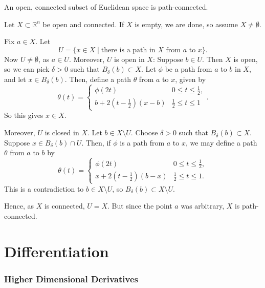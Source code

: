 \documentclass[12pt]{article}
\begin{document}
\begin{proposition}
	An open, connected subset of Euclidean space is path-connected.
\end{proposition}

\begin{proofbox}
	Let $X \subset \mathbb{R}^{n}$ be open and connected. If $X$ is empty, we are done, so assume $X \neq \emptyset$.

	Fix $a \in X$. Let
	\[
		U = \{x \in X \mid \text{there is a path in } X \text{ from } a \text{ to } x\}
	.\]
	Now $U \neq \emptyset$, as $a \in U$. Moreover, $U$ is open in $X$: Suppose $b \in U$. Then $X$ is open, so we can pick $\delta > 0$ such that $B_{\delta}(b) \subset X$. Let $\phi$ be a path from $a$ to $b$ in $X$, and let $x \in B_{\delta}(b)$. Then, define a path $\theta$ from $a$ to $x$, given by
	\[
		\theta(t) =
		\begin{cases}
			\phi(2t) & 0 \leq t \leq \frac{1}{2}, \\
			b + 2(t - \frac{1}{2})(x - b) & \frac{1}{2} \leq t \leq 1
		\end{cases}
	.\]
	So this gives $x \in X$.

	Moreover, $U$ is closed in $X$. Let $b \in X \setminus U$. Choose $\delta > 0$ such that $B_{\delta}(b) \subset X$. Suppose $x \in B_{\delta}(b) \cap U$. Then,  if $\phi$ is a path from $a$ to $x$, we may define a path $\theta$ from $a$ to $b$ by
	\[
		\theta(t) =
		\begin{cases}
			\phi(2t) & 0 \leq t \leq \frac{1}{2}, \\
			x + 2(t - \frac{1}{2})(b-x) & \frac{1}{2} \leq t \leq 1.
		\end{cases}
	\]
	This is a contradiction to $b \in X \setminus U$, so $B_{\delta}(b) \subset X \setminus U$.

	Hence, as $X$ is connected, $U = X$. But since the point $a$ was arbitrary, $X$ is path-connected.
\end{proofbox}

\newpage

\part{Differentiation}%
\label{prt:differentiation}

\section{Higher Dimensional Derivatives}
\label{sec:higher_dimensional_derivatives}
\end{document}
